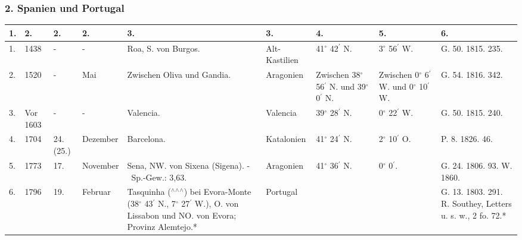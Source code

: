 \documentclass[a4paper, 8pt, oneside, polutonikogreek, german]{article}
\begin{document}
\clearpage
\begin{landscape}
\subsubsection{2. Spanien und Portugal}
\begin{table}[!ht]
    \centering
    \footnotesize
    \begin{tabular}{|l|l|l|l|p{40mm}|l|p{14mm}|p{14mm}|p{18mm}|}
    \hline
        1. & 2. & 2. & 2. & 3. & 3. & 4. & 5. & 6. \\ \hline
        1. & 1438 & - & - & Roa, S. von Burgos. & Alt-Kastilien & 41$^\circ$ 42$^\prime$ N. & 3$^\circ$ 56$^\prime$ W. & G. 50. 1815. 235. \\ \hline
        2. & 1520 & - & Mai & Zwischen Oliva und Gandia. & Aragonien & Zwischen 38$^\circ$ 56$^\prime$ N. und 39$^\circ$ 0$^\prime$ N. & Zwischen 0$^\circ$ 6$^\prime$ W. und 0$^\circ$ 10$^\prime$ W. & G. 54. 1816. 342. \\ \hline
        3. & Vor 1603 & - & - & Valencia. & Valencia & 39$^\circ$ 28$^\prime$ N. & 0$^\circ$ 22$^\prime$ W. & G. 50. 1815. 240. \\ \hline
        4. & 1704 & 24. (25.) & Dezember & Barcelona. & Katalonien & 41$^\circ$ 24$^\prime$ N. & 2$^\circ$ 10$^\prime$ O. & P. 8. 1826. 46. \\ \hline
        5. & 1773 & 17. & November & Sena, NW. von Sixena (Sigena). - Sp.-Gew.: 3,63. & Aragonien & 41$^\circ$ 36$^\prime$ N. & 0$^\circ$ 0$^\prime$. & G. 24. 1806. 93. W. 1860. \\ \hline
        6. & 1796 & 19. & Februar & Tasquinha ($^\wedge$$^\wedge$$^\wedge$) bei Evora-Monte (38$^\circ$ 43$^\prime$ N., 7$^\circ$ 27$^\prime$ W.), O. von Lissabon und NO. von Evora; Provinz Alemtejo.* & Portugal & ~ & ~ & G. 13. 1803. 291. R. Southey, Letters u. s. w., 2 fo. 72.* \\ \hline
    \end{tabular}
\end{table}
\end{landscape}
\clearpage
\end{document}
